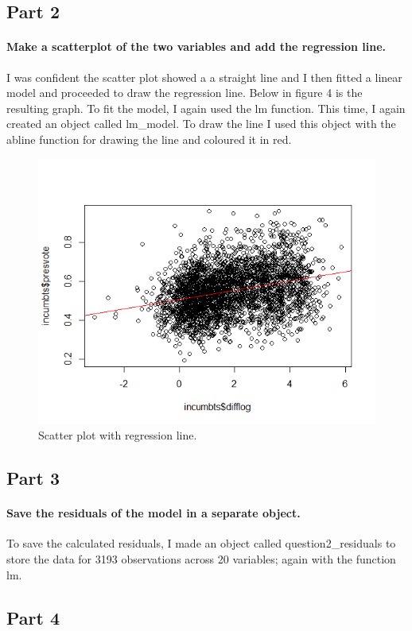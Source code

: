 \documentclass{article}
\begin{document}
\subsection{Part 2}
\paragraph{Make a scatterplot of the two variables and add the regression line.}
I was confident the scatter plot showed a a straight line and I then fitted a linear model and proceeded to draw the regression line. Below in figure 4 is the resulting graph. To fit the model, I again used the lm function. This time, I again created an object called lm\_model. To draw the line I used this object with the abline function for drawing the line and coloured it in red.
\begin{figure}[h!]
	\centering
	\includegraphics[width=0.9\linewidth]{Question2 - Scatter Plot with regression line.png}
	\caption{Scatter plot with regression line.}
	\label{fig:Scatter plot with regression line}
\end{figure}
\subsection{Part 3}
\paragraph{Save the residuals of the model in a separate object.}
To save the calculated residuals, I made an object called question2\_residuals to store the data for 3193 observations across 20 variables; again with the function lm. 
\subsection{Part 4}
\end{document}
